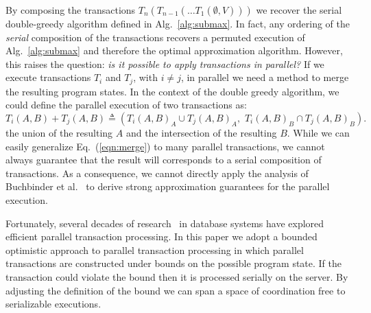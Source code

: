 \documentclass{article} %
\newcommand{\eg}{{\em e.g.,}~}
\newcommand{\eqnref}[1]{Eq.~(\ref{#1})}
\newcommand{\algref}[1]{Alg.~\ref{#1}}
\newcommand{\union}{\cup}
\newcommand{\inter}{\cap}
\begin{document}
By composing the transactions $T_n (T_{n-1}(\ldots T_1(\emptyset, V)))$ we recover the serial double-greedy algorithm defined in \algref{alg:submax}.
In fact, any ordering of the \emph{serial} composition of the transactions recovers a permuted execution of \algref{alg:submax} and therefore the optimal approximation algorithm.
However, this raises the question: \emph{is it possible to apply transactions in parallel?}
If we execute transactions $T_i$ and $T_j$, with $i \neq j$, in parallel we
need a method to merge the resulting program states.
In the context of the double greedy algorithm, we could define the parallel execution of two transactions as:
\begin{equation}
T_i(A,B) + T_j(A,B) \triangleq \left(T_i(A,B)_A \union T_j(A,B)_A,  \,\, T_i(A,B)_B  \inter T_j(A,B)_B \right).
\label{eqn:merge}
\end{equation}
the union of the resulting $A$ and the intersection of the resulting $B$.
While we can easily generalize \eqnref{eqn:merge} to many parallel transactions, we cannot always guarantee that the result will corresponds to a serial composition of transactions.
As a consequence, we cannot directly apply the analysis of Buchbinder et al.~\cite{buchbinder2012} to derive strong approximation guarantees for the parallel execution.

Fortunately, several decades of research~\citep{Ozsu07,kung1981:occ} in database systems have explored efficient parallel transaction processing.
In this paper we adopt a bounded optimistic approach to parallel transaction processing in which parallel transactions are constructed under bounds on the possible program state.
If the transaction could violate the bound then it is processed serially on the server.
By adjusting the definition of the bound we can span a space of coordination free to serializable executions.








\end{document}
